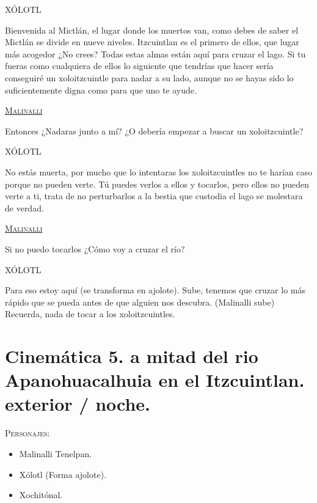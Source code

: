 \documentclass[11pt,letterpaper]{article}
\begin{document}
\begin{center}
XÓLOTL
\\
\par
Bienvenida al Mictlán, el lugar donde los muertos van, como debes de saber el Mictlán se divide en nueve niveles. Itzcuintlan es el primero de ellos, que lugar más acogedor ¿No crees? Todas estas almas están aquí para cruzar el lago. Si tu fueras como cualquiera de ellos lo siguiente que tendrías que hacer sería conseguiré un xoloitzcuintle para nadar a su lado, aunque no se hayas sido lo suficientemente digna como para que uno te ayude.
\\
\par
\textsc{\underline{Malinalli}}
\\
\par
Entonces ¿Nadaras junto a mí? ¿O debería empezar a buscar un xoloitzcuintle?
\\
\par
XÓLOTL
\\
\par
No estás muerta, por mucho que lo intentaras los xoloitzcuintles no te harían caso porque no pueden verte. Tú puedes verlos a ellos y tocarlos, pero ellos no pueden verte a ti, trata de no perturbarlos a la bestia que custodia el lago se molestara de verdad.
\\
\par
\textsc{\underline{Malinalli}}
\\
\par
Si no puedo tocarlos ¿Cómo voy a cruzar el río?
\\
\par
XÓLOTL
\\
\par
Para eso estoy aquí (se transforma en ajolote). Sube, tenemos que cruzar lo más rápido que se pueda antes de que alguien nos descubra. (Malinalli sube) Recuerda, nada de tocar a los xoloitzcuintles.
\end{center}

\section{Cinemática 5. a mitad del rio Apanohuacalhuia en el Itzcuintlan. exterior / noche.}
 \textsc{Personajes}:

\begin{itemize}
	\item Malinalli Tenelpan.
	\item Xólotl (Forma ajolote).
	\item Xochitónal.
\end{itemize}
\end{document}
